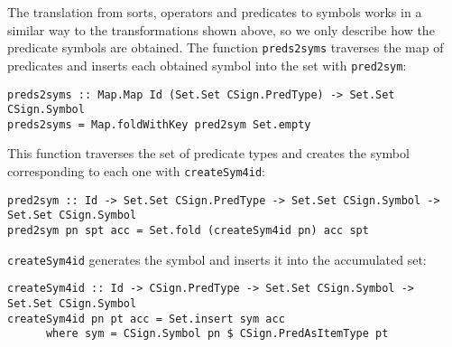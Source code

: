 The translation from sorts, operators and predicates to symbols
works in a similar way to the transformations shown above, so we only
describe  how the predicate symbols are obtained. The function
\verb"preds2syms" traverses the map of predicates and inserts each
obtained symbol into the set with \verb"pred2sym":

{\codesize
\begin{verbatim}
preds2syms :: Map.Map Id (Set.Set CSign.PredType) -> Set.Set CSign.Symbol
preds2syms = Map.foldWithKey pred2sym Set.empty
\end{verbatim}
}

This function traverses the set of predicate types and creates the
symbol corresponding to each one with \verb"createSym4id":

{\codesize
\begin{verbatim}
pred2sym :: Id -> Set.Set CSign.PredType -> Set.Set CSign.Symbol -> Set.Set CSign.Symbol
pred2sym pn spt acc = Set.fold (createSym4id pn) acc spt
\end{verbatim}
}

\verb"createSym4id" generates the symbol and inserts it into the
accumulated set:

{\codesize
\begin{verbatim}
createSym4id :: Id -> CSign.PredType -> Set.Set CSign.Symbol -> Set.Set CSign.Symbol
createSym4id pn pt acc = Set.insert sym acc
      where sym = CSign.Symbol pn $ CSign.PredAsItemType pt
\end{verbatim}
}





















